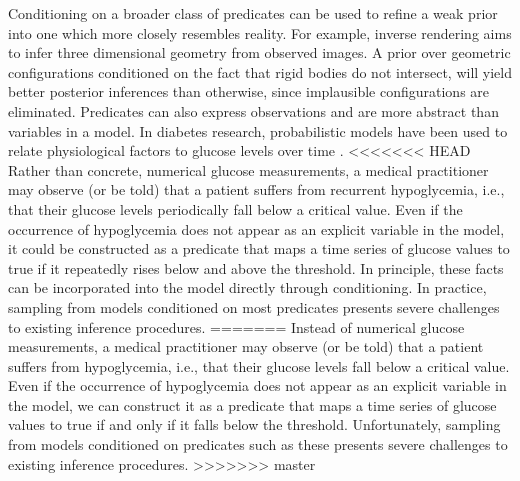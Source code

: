 Conditioning on a broader class of predicates can be used to refine a weak prior into one which more closely resembles reality.
For example, inverse rendering  \cite{marschner1998inverse,kulkarni2015deep} aims to infer three dimensional geometry from observed images.
A prior over geometric configurations conditioned on the fact that rigid bodies do not intersect,  will yield better posterior inferences than otherwise, since implausible configurations are eliminated.
Predicates can also express observations and are more abstract than variables in a model.
In diabetes research, probabilistic models have been used to relate physiological factors to glucose levels over time \citep{levine2017offline,murata2004probabilistic}.
<<<<<<< HEAD
Rather than concrete, numerical glucose measurements, a medical practitioner may observe (or be told) that a patient suffers from recurrent hypoglycemia, i.e., that their glucose levels periodically fall below a critical value.
Even if the occurrence of hypoglycemia does not appear as an explicit variable in the model, it could be constructed as a predicate that maps a time series of glucose values to true if  it repeatedly rises below and above the threshold.
In principle, these facts can be incorporated into the model directly through conditioning.	
In practice, sampling from models conditioned on most predicates presents severe challenges to existing inference procedures.
=======
Instead of numerical glucose measurements, a medical practitioner may observe (or be told) that a patient suffers from hypoglycemia, i.e., that their glucose levels fall below a critical value.
Even if the occurrence of hypoglycemia does not appear as an explicit variable in the model, we can construct it as a predicate that maps a time series of glucose values to true if and only if it falls below the threshold.
Unfortunately, sampling from models conditioned on predicates such as these presents severe challenges to existing inference procedures.
>>>>>>> master


